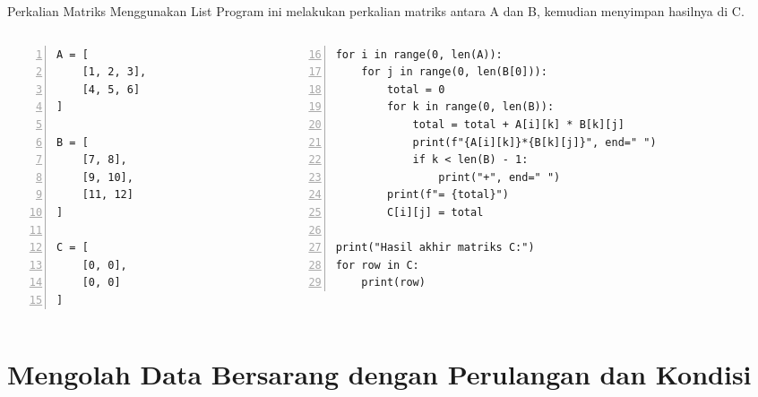 \documentclass[aspectratio=169, table]{beamer}
\begin{document}
\begin{frame}[fragile]{Perkalian Matriks Menggunakan List}
\vspace{20pt}
Program ini melakukan perkalian matriks antara A dan B, kemudian menyimpan hasilnya di C.
\begin{columns}[T]
  \begin{column}{0.2\textwidth}
    \begin{lstlisting}[style=PythonStyle, numbers=left, firstnumber=1, basicstyle=\ttfamily\scriptsize]
A = [
    [1, 2, 3],
    [4, 5, 6]
]

B = [
    [7, 8],
    [9, 10],
    [11, 12]
]

C = [
    [0, 0],
    [0, 0]
]

    \end{lstlisting}
  \end{column}

  \begin{column}{0.68\textwidth}
    \begin{lstlisting}[style=PythonStyle, numbers=left, firstnumber=16, basicstyle=\ttfamily\scriptsize]
for i in range(0, len(A)):
    for j in range(0, len(B[0])):
        total = 0
        for k in range(0, len(B)):
            total = total + A[i][k] * B[k][j]
            print(f"{A[i][k]}*{B[k][j]}", end=" ")
            if k < len(B) - 1:
                print("+", end=" ")
        print(f"= {total}")
        C[i][j] = total

print("Hasil akhir matriks C:")
for row in C:
    print(row)
    \end{lstlisting}
  \end{column}
\end{columns}

\end{frame}

\section{Mengolah Data Bersarang dengan Perulangan dan Kondisi}
\end{document}
